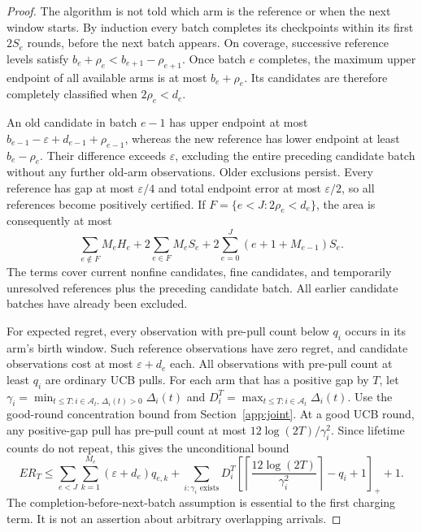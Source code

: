 \documentclass[11pt]{article}
\theoremstyle{remark}
\begin{document}
\begin{proof}
The algorithm is not told which arm is the reference or when the next window
starts. By induction every batch completes its checkpoints within its first
$2S_e$ rounds, before the next batch appears. On coverage, successive
reference levels satisfy $b_e+\rho_e<b_{e+1}-\rho_{e+1}$. Once batch $e$
completes, the maximum upper endpoint of all available arms is at most
$b_e+\rho_e$. Its candidates are therefore completely classified when
$2\rho_e<d_e$.

An old candidate in batch $e-1$ has upper endpoint at most
$b_{e-1}-\varepsilon+d_{e-1}+\rho_{e-1}$, whereas the new reference has
lower endpoint at least $b_e-\rho_e$. Their difference exceeds
$\varepsilon$, excluding the entire preceding candidate batch without any
further old-arm observations. Older exclusions persist. Every reference has
gap at most $\varepsilon/4$ and total endpoint error at most
$\varepsilon/2$, so all references become positively certified.
If $F=\{e<J:2\rho_e<d_e\}$, the area is consequently at most
\[
 \sum_{e\notin F}M_eH_e+2\sum_{e\in F}M_eS_e+
                2\sum_{e=0}^J(e+1+M_{e-1})S_e.
\]
The terms cover current nonfine candidates, fine candidates, and temporarily
unresolved references plus the preceding candidate batch. All earlier
candidate batches have already been excluded.

For expected regret, every observation with pre-pull count below $q_i$
occurs in its arm's birth window. Such reference observations have zero
regret, and candidate observations cost at most $\varepsilon+d_e$ each.
All observations with pre-pull count at least $q_i$ are ordinary UCB pulls.
For each arm that has a positive gap by $T$, let
$\gamma_i=\min_{t\le T:i\in\mathcal A_t,\,\Delta_i(t)>0}\Delta_i(t)$
and $D_i^T=\max_{t\le T:i\in\mathcal A_t}\Delta_i(t)$.
Use the good-round concentration bound from Section~\ref{app:joint}. At a good UCB round, any positive-gap
pull has pre-pull count at most $12\log(2T)/\gamma_i^2$. Since lifetime counts do not
repeat, this gives the unconditional bound
\begin{equation}
\label{eq:app_reuse_regret}
 ER_T\le\sum_{e<J}\sum_{k=1}^{M_e}(\varepsilon+d_e)q_{e,k}
 +\sum_{i:\gamma_i\text{ exists}}D_i^T
 \left[\left\lceil\frac{12\log(2T)}{\gamma_i^2}\right\rceil-q_i+1\right]_+
 +1.
\end{equation}
The completion-before-next-batch assumption is essential to the first
charging term. It is not an assertion about arbitrary overlapping arrivals.

\end{proof}
\end{document}
